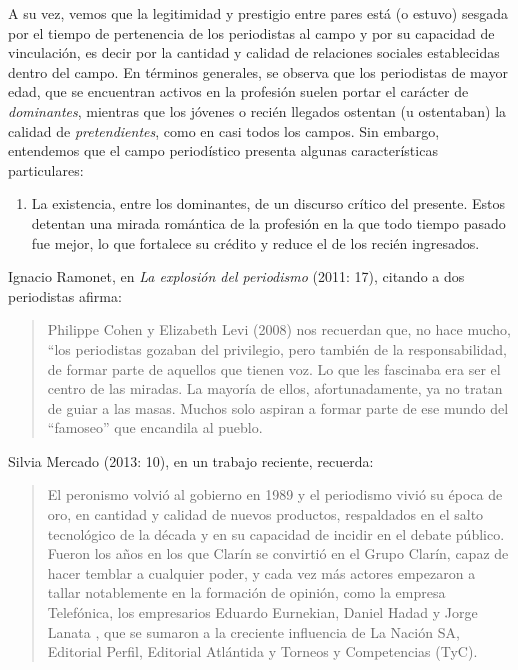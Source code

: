 A su vez, vemos que la legitimidad y prestigio entre pares está (o estuvo) sesgada por el tiempo de pertenencia de los periodistas al campo y por su capacidad de vinculación, es decir por la cantidad y calidad de relaciones sociales establecidas dentro del campo. En términos generales, se observa que los periodistas de mayor edad, que se encuentran activos en la profesión suelen portar el carácter de \emph{dominantes}, mientras que los jóvenes o recién llegados ostentan (u ostentaban) la calidad de \emph{pretendientes}, como en casi todos los campos. Sin embargo, entendemos que el campo periodístico presenta algunas características particulares:

\begin{enumerate}
\def\labelenumi{\alph{enumi})}
\item
  La existencia, entre los dominantes, de un discurso crítico del presente. Estos detentan una mirada romántica de la profesión en la que todo tiempo pasado fue mejor, lo que fortalece su crédito y reduce el de los recién ingresados.
\end{enumerate}

Ignacio Ramonet, en \emph{La explosión del periodismo} (2011: 17), citando a dos periodistas afirma:

\begin{quote}
Philippe Cohen y Elizabeth Levi (2008) nos recuerdan que, no hace mucho, ``los periodistas gozaban del privilegio, pero también de la responsabilidad, de formar parte de aquellos que tienen voz. Lo que les fascinaba era ser el centro de las miradas. La mayoría de ellos, afortunadamente, ya no tratan de guiar a las masas. Muchos solo aspiran a formar parte de ese mundo del ``famoseo'' que encandila al pueblo.
\end{quote}

Silvia Mercado (2013: 10), en un trabajo reciente, recuerda:

\begin{quote}
El peronismo volvió al gobierno en 1989 y el periodismo vivió su época de oro, en cantidad y calidad de nuevos productos, respaldados en el salto tecnológico de la década y en su capacidad de incidir en el debate público. Fueron los años en los que Clarín se convirtió en el Grupo Clarín, capaz de hacer temblar a cualquier poder, y cada vez más actores empezaron a tallar notablemente en la formación de opinión, como la empresa Telefónica, los empresarios Eduardo Eurnekian, Daniel Hadad y Jorge Lanata , que se sumaron a la creciente influencia de La Nación SA, Editorial Perfil, Editorial Atlántida y Torneos y Competencias (TyC).
\end{quote}

